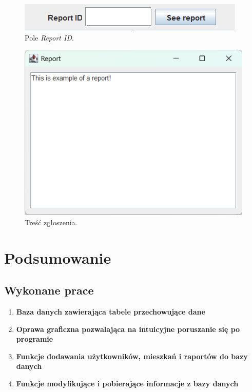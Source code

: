 \begin{figure}[H]
    \centering
    \includegraphics[width=\textwidth,height=0.15\textheight,keepaspectratio]{figures/app-images/admin-panel-report.png}
    \caption{Pole \textit{Report ID}.\label{fig21}}
\end{figure}

\begin{figure}[H]
    \centering
    \includegraphics[width=\textwidth,height=0.3\textheight,keepaspectratio]{figures/app-images/see-report.png}
    \caption{Treść zgłoszenia.\label{fig22}}
\end{figure}
\chapter{Podsumowanie}
\section{Wykonane prace}
\begin{enumerate}
    \item \textbf{Baza danych zawierająca tabele przechowujące dane}
    \item \textbf{Oprawa graficzna pozwalająca na intuicyjne poruszanie się po programie}
    \item \textbf{Funkcje dodawania użytkowników, mieszkań i raportów do bazy danych}
    \item \textbf{Funkcje modyfikujące i pobierające informacje z bazy danych}
\end{enumerate}
